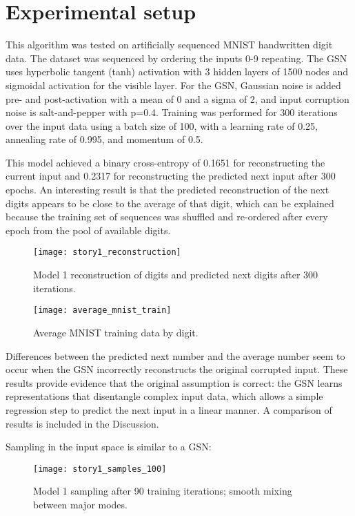 \section{Experimental setup}

This algorithm was tested on artificially sequenced MNIST handwritten digit data. The dataset was sequenced by ordering the inputs 0-9 repeating. The GSN uses hyperbolic tangent (tanh) activation with 3 hidden layers of 1500 nodes and sigmoidal activation for the visible layer. For the GSN, Gaussian noise is added pre- and post-activation with a mean of 0 and a sigma of 2, and input corruption noise is salt-and-pepper with p=0.4. Training was performed for 300 iterations over the input data using a batch size of 100, with a learning rate of 0.25, annealing rate of 0.995, and momentum of 0.5.

This model achieved a binary cross-entropy of 0.1651 for reconstructing the current input  and 0.2317 for reconstructing the predicted next input after 300 epochs. An interesting result is that the predicted reconstruction of the next digits appears to be close to the average of that digit, which can be explained because the training set of sequences was shuffled and re-ordered after every epoch from the pool of available digits.

\begin{figure}[h!]
  \centering
    \texttt{[image: story1\_reconstruction]}
\caption{Model 1 reconstruction of digits and predicted next digits after 300 iterations.}
\end{figure}

\begin{figure}[h!]
  \centering
    \texttt{[image: average\_mnist\_train]}
\caption{Average MNIST training data by digit.}
\end{figure}

Differences between the predicted next number and the average number seem to occur when the GSN incorrectly reconstructs the original corrupted input. These results provide evidence that the original assumption is correct: the GSN learns representations that disentangle complex input data, which allows a simple regression step to predict the next input in a linear manner. A comparison of results is included in the Discussion.

Sampling in the input space is similar to a GSN:
\begin{figure}[h!]
  \centering
    \texttt{[image: story1\_samples\_100]}
\caption{Model 1 sampling after 90 training iterations; smooth mixing between major modes.}
\end{figure}
